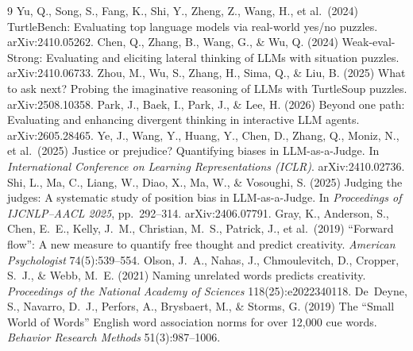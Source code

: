 \documentclass{article}
\begin{document}
\begin{thebibliography}{9}\small
{} Yu, Q., Song, S., Fang, K., Shi, Y., Zheng, Z., Wang,
H., et al.\ (2024) TurtleBench: Evaluating top language models via real-world
yes/no puzzles. arXiv:2410.05262.
 Chen, Q., Zhang, B., Wang, G., \& Wu, Q. (2024)
Weak-eval-Strong: Evaluating and eliciting lateral thinking of LLMs with
situation puzzles. arXiv:2410.06733.
 Zhou, M., Wu, S., Zhang, H., Sima, Q., \& Liu, B. (2025)
What to ask next? Probing the imaginative reasoning of LLMs with TurtleSoup
puzzles. arXiv:2508.10358.
 Park, J., Baek, I., Park, J., \& Lee, H. (2026) Beyond one
path: Evaluating and enhancing divergent thinking in interactive LLM agents.
arXiv:2605.28465.
 Ye, J., Wang, Y., Huang, Y., Chen, D., Zhang, Q., Moniz, N.,
et al.\ (2025) Justice or prejudice? Quantifying biases in LLM-as-a-Judge. In
\emph{International Conference on Learning Representations (ICLR)}.
arXiv:2410.02736.
 Shi, L., Ma, C., Liang, W., Diao, X., Ma, W., \& Vosoughi,
S. (2025) Judging the judges: A systematic study of position bias in
LLM-as-a-Judge. In \emph{Proceedings of IJCNLP--AACL 2025}, pp.~292--314.
arXiv:2406.07791.
 Gray, K., Anderson, S., Chen, E.~E., Kelly, J.~M.,
Christian, M.~S., Patrick, J., et al.\ (2019) ``Forward flow'': A new measure
to quantify free thought and predict creativity. \emph{American Psychologist}
74(5):539--554.
 Olson, J.~A., Nahas, J., Chmoulevitch, D., Cropper, S.~J., \&
Webb, M.~E. (2021) Naming unrelated words predicts creativity.
\emph{Proceedings of the National Academy of Sciences} 118(25):e2022340118.
 De~Deyne, S., Navarro, D.~J., Perfors, A., Brysbaert, M., \&
Storms, G. (2019) The ``Small World of Words'' English word association norms
for over 12,000 cue words. \emph{Behavior Research Methods} 51(3):987--1006.
\end{thebibliography}

\appendix
\newpage
\end{document}
